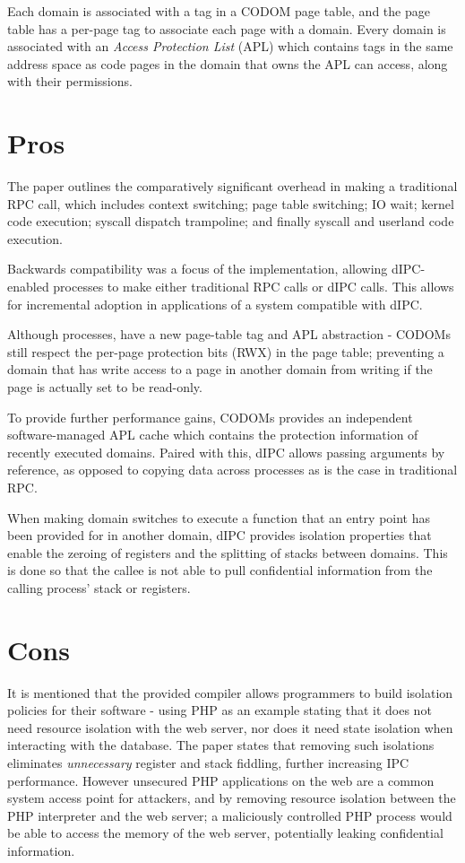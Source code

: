 \documentclass{article}
\begin{document}
Each domain is associated with a tag in a CODOM page table, and the page table has a per-page tag to associate each page with a domain. Every domain is  associated with an \textit{Access Protection List} (APL) which contains tags in the same address space as code pages in the domain that owns the APL can access, along with their permissions.

\section*{Pros}
The paper outlines the comparatively significant overhead in making a traditional RPC call, which includes context switching; page table switching; IO wait; kernel code execution; syscall dispatch trampoline; and finally syscall and userland code execution.

Backwards compatibility was a focus of the implementation, allowing dIPC-enabled processes to make either traditional RPC calls or dIPC calls. This allows for incremental adoption in applications of a system compatible with dIPC.

Although processes, have a new page-table tag and APL abstraction - CODOMs still respect the per-page protection bits (RWX) in the page table; preventing a domain that has write access to a page in another domain from writing if the page is actually set to be read-only.

To provide further performance gains, CODOMs provides an independent software-managed APL cache which contains the protection information of recently executed domains. Paired with this, dIPC allows passing arguments by reference, as opposed to copying data across processes as is the case in traditional RPC.

When making domain switches to execute a function that an entry point has been provided for in another domain, dIPC provides isolation properties that enable the zeroing of registers and the splitting of stacks between domains. This is done so that the callee is not able to pull confidential information from the calling process' stack or registers.


\section*{Cons}
It is mentioned that the provided compiler allows programmers to build isolation policies for their software - using PHP as an example stating that it does not need resource isolation with the web server, nor does it need state isolation when interacting with the database. The paper states that removing such isolations eliminates \textit{unnecessary} register and stack fiddling, further increasing IPC performance. However unsecured PHP applications on the web are a common system access point for attackers, and by removing resource isolation between the PHP interpreter and the web server; a maliciously controlled PHP process would be able to access the memory of the web server, potentially leaking confidential information.
\end{document}
